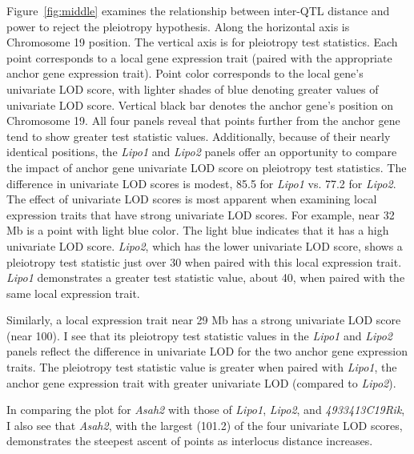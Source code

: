 \documentclass[oneside]{book}\usepackage[]{graphicx}\usepackage[]{color}
\begin{document}
Figure~\ref{fig:middle} examines the relationship between inter-QTL distance and power to reject the pleiotropy hypothesis.
Along the horizontal axis is Chromosome 19 position. 
The vertical axis is for pleiotropy test statistics. 
Each point corresponds to a local gene expression trait (paired with the appropriate anchor gene expression trait). 
Point color corresponds to the local gene's univariate LOD score, with lighter shades of blue denoting greater values of univariate LOD score. 
Vertical black bar denotes the anchor gene's position on Chromosome 19. 
All four panels reveal that points further from the anchor gene tend to show greater test statistic values. 
Additionally, because of their nearly identical positions, the \emph{Lipo1} and \emph{Lipo2} panels offer an opportunity to compare the impact 
of anchor gene univariate LOD score on pleiotropy test statistics.
The difference in univariate LOD scores is modest, 85.5 for \emph{Lipo1} vs. 77.2 for \emph{Lipo2}. The effect of univariate LOD scores is most apparent when examining local expression traits that have strong univariate LOD scores. 
For example, near 32 Mb is a point with light blue color. The light blue indicates that it has a high univariate LOD score. 
\emph{Lipo2}, which has the lower univariate LOD score, shows a pleiotropy test statistic just over 30 when paired with this local expression trait. 
\emph{Lipo1} demonstrates a greater test statistic value, about 40, when paired with the same local expression trait.

Similarly, a local expression trait near 29 Mb has a strong univariate LOD score (near 100). 
I see that its pleiotropy test statistic values in the \emph{Lipo1} and \emph{Lipo2} panels reflect the difference in univariate LOD for the two anchor gene expression traits. 
The pleiotropy test statistic value is greater when 
paired with \emph{Lipo1}, the anchor gene expression trait with greater univariate LOD (compared to \emph{Lipo2}). 

In comparing the plot for \emph{Asah2} with those of \emph{Lipo1}, \emph{Lipo2}, and \emph{4933413C19Rik}, I also see that \emph{Asah2}, with the largest (101.2) of the four univariate LOD scores, demonstrates the steepest ascent of points as interlocus distance increases. 





\end{document}
